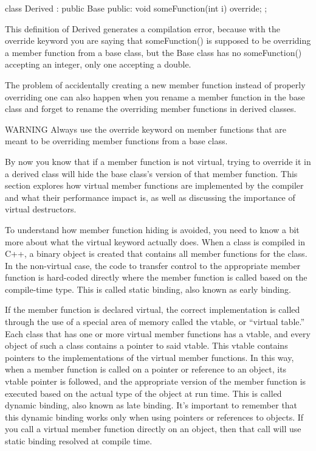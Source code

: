 \begin{cpp}
class Derived : public Base
{
    public:
        void someFunction(int i) override;
};
\end{cpp}

This definition of Derived generates a compilation error, because with the override keyword you are saying that someFunction() is supposed to be overriding a member function from a base class, but the Base class has no someFunction() accepting an integer, only one accepting a double.

The problem of accidentally creating a new member function instead of properly overriding one can also happen when you rename a member function in the base class and forget to rename the overriding member functions in derived classes.

\begin{myWarning}{WARNING}
Always use the override keyword on member functions that are meant to be overriding member functions from a base class.
\end{myWarning}


By now you know that if a member function is not virtual, trying to override it in a derived class will hide the base class’s version of that member function. This section explores how virtual member functions are implemented by the compiler and what their performance impact is, as well as discussing the importance of virtual destructors.


To understand how member function hiding is avoided, you need to know a bit more about what the virtual keyword actually does. When a class is compiled in C++, a binary object is created that contains all member functions for the class. In the non-virtual case, the code to transfer control to the appropriate member function is hard-coded directly where the member function is called based on the compile-time type. This is called static binding, also known as early binding.

If the member function is declared virtual, the correct implementation is called through the use of a special area of memory called the vtable, or “virtual table.” Each class that has one or more virtual member functions has a vtable, and every object of such a class contains a pointer to said vtable. This vtable contains pointers to the implementations of the virtual member functions. In this way, when a member function is called on a pointer or reference to an object, its vtable pointer is followed, and the appropriate version of the member function is executed based on the actual type of the object at run time. This is called dynamic binding, also known as late binding. It’s important to remember that this dynamic binding works only when using pointers or references to objects. If you call a virtual member function directly on an object, then that call will use static binding resolved at compile time.

